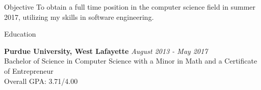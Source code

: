 \documentclass{resume} %
\begin{document}
\center

\begin{rSection}{Objective}
To obtain a full time position in the computer science field in summer 2017, utilizing my skills in software engineering.
\end{rSection}
\begin{rSection}{Education}

{\bf Purdue University, West Lafayette} \hfill {\em August 2013 - May 2017} \\ 
Bachelor of Science in Computer Science with a Minor in Math and a Certificate of Entrepreneur \\
Overall GPA: 3.71/4.00

\end{rSection}

\end{document}
